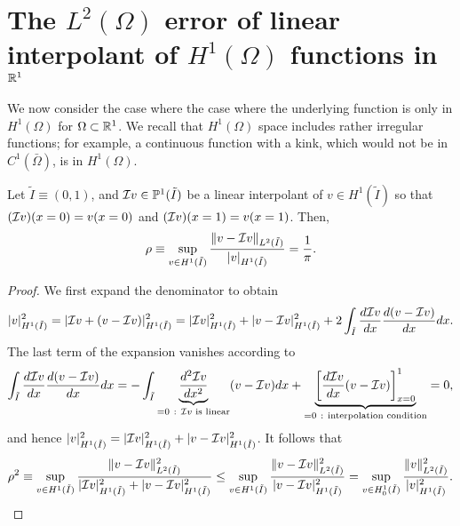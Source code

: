 \section{The $L^2(\Omega)$ error of linear interpolant of $H^1(\Omega)$ functions in $\mathbb{R}^1$}
\label{sec:th_interp_l2_h1}
We now consider the case where the case where the underlying function is only in $H^1(\Omega)$ for $\Omega \subset \mathbb{R}^1$.  We recall that $H^1(\Omega)$ space includes rather irregular functions; for example, a continuous function with a kink, which would not be in $C^1(\bar \Omega)$, is in $H^1(\Omega)$. 
\begin{proposition}
  \label{lemma:th_l2_h1_embed}
Let $\tilde I \equiv (0,1)$, and $\mathcal{I} v \in \mathbb{P}^1(\tilde I)$ be a linear interpolant of $v \in H^1(\tilde I)$ so that $(\mathcal{I} v)(x=0) = v(x=0)$ and $(\mathcal{I} v)(x=1) = v(x=1)$.  Then,
\begin{equation*}
  \rho \equiv \sup_{v \in H^1(\tilde I)} \frac{\| v - \mathcal{I} v \|_{L^2(\tilde I)}}{| v |_{H^1(\tilde I)}} = \frac{1}{\pi}.
\end{equation*}
\begin{proof}
  We first expand the denominator to obtain
  \begin{equation*}
    | v |_{H^1(\tilde I)}^2
    = | \mathcal{I} v + (v - \mathcal{I} v) |_{H^1(\tilde I)}^2
    =  | \mathcal{I} v |_{H^1(\tilde I)}^2 +  | v - \mathcal{I} v |_{H^1(\tilde I)}^2 + 2 \int_{\tilde I} \frac{d \mathcal{I} v}{d x} \frac{d (v - \mathcal{I} v)}{d x} dx .
  \end{equation*}
  The last term of the expansion vanishes according to
  \begin{equation*}
    \int_{\tilde I} \dd{\calI v}{x} \dd{(v - \calI v)}{x} dx
    =
    - \int_{\tilde I} \underbrace{\dd{^2 \calI v}{x^2}}_{=0\ :\ \text{$\calI v$ is linear}} (v - \calI v) dx
    + \underbrace{\left[ \dd{\calI v}{x} (v - \calI v) \right]_{x=0}^1}_{=0\ :\ \text{interpolation condition}} = 0,
  \end{equation*}
  and hence $ | v |_{H^1(\tilde I)}^2 =  | \mathcal{I} v |_{H^1(\tilde I)}^2 +  | v - \mathcal{I} v |_{H^1(\tilde I)}^2 $.  It follows that
  \begin{equation*} 
    \rho^2
    \equiv \sup_{v \in H^1(\tilde I)} \frac{\| v - \mathcal{I} v \|^2_{L^2(\tilde I)}}{| \mathcal{I} v |_{H^1(\tilde I)}^2 +  | v - \mathcal{I} v |_{H^1(\tilde I)}^2}
    \leq  \sup_{v \in H^1(\tilde I)} \frac{\| v - \mathcal{I} v \|^2_{L^2(\tilde I)}}{| v - \mathcal{I} v |_{H^1(\tilde I)}^2}
    =\sup_{v \in H^1_0(\tilde I)} \frac{\| v \|^2_{L^2(\tilde I)}}{| v |_{H^1(\tilde I)}^2}.
  \end{equation*}

\end{proof}
\end{proposition}
